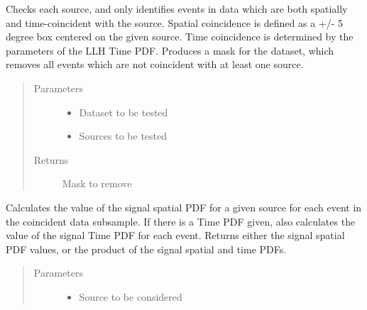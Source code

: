 \documentclass[letterpaper,10pt,english]{sphinxmanual}
\begin{document}
\begin{fulllineitems}
\begin{fulllineitems}
\label{\detokenize{index:flarestack.core.llh.LLH.select_spatially_coincident_data}}
Checks each source, and only identifies events in data which are
both spatially and time-coincident with the source. Spatial
coincidence is defined as a +/- 5 degree box centered on the  given
source. Time coincidence is determined by the parameters of the LLH
Time PDF. Produces a mask for the dataset, which removes all events
which are not coincident with at least one source.
\begin{quote}\begin{description}
\item[{Parameters}] \leavevmode\begin{itemize}
\item {} 
 \textendash{} Dataset to be tested

\item {} 
 \textendash{} Sources to be tested

\end{itemize}

\item[{Returns}] \leavevmode
Mask to remove

\end{description}\end{quote}

\end{fulllineitems}


\begin{fulllineitems}
\label{\detokenize{index:flarestack.core.llh.LLH.signal_pdf}}
Calculates the value of the signal spatial PDF for a given source
for each event in the coincident data subsample. If there is a Time PDF
given, also calculates the value of the signal Time PDF for each event.
Returns either the signal spatial PDF values, or the product of the
signal spatial and time PDFs.
\begin{quote}\begin{description}
\item[{Parameters}] \leavevmode\begin{itemize}
\item {} 
 \textendash{} Source to be considered


\end{itemize}
\end{description}
\end{quote}
\end{fulllineitems}
\end{fulllineitems}
\end{document}
